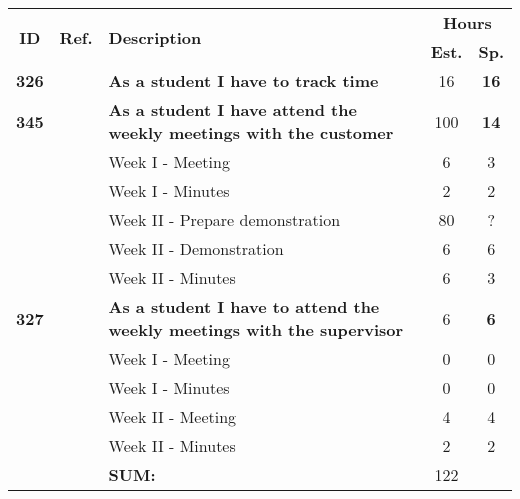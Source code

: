 \label{tab:sprint5storiesProcess}
\def\arraystretch{1.25}
 
\begin{longtable}{ccXcc}

\toprule[0.5mm]
\multirow{2}{*}{\textbf{ID}} &
\multirow{2}{*}{\textbf{Ref.}} & \multirow{2}{*}{\textbf{Description}} & \multicolumn{2}{c}{\textbf{Hours}} \\
 					& & & \textbf{Est.} & \textbf{Sp.} \\

\midrule

\textbf{326} 	&& {\bf  As a student I have to track time} 										& 	16	& \textbf{16} \\
	
\textbf{345} 	&& {\bf As a student I have attend the weekly meetings with the customer} 			& 	100	& \textbf{14} \\
		&& Week I - Meeting							&  6  & 3 \\
		&& Week I - Minutes							&  2  & 2 \\
		&& Week II - Prepare demonstration			&  80 & ? \\
		&& Week II - Demonstration					&  6  & 6 \\
		&& Week II - Minutes						&  6  & 3 \\


		
\textbf{327} 	&& {\bf As a student I have to attend the weekly meetings with the supervisor} 		& 	6	& \textbf{6} \\
		&& Week I - Meeting							&  0 & 0 \\
		&& Week I - Minutes							&  0 & 0 \\
		&& Week II - Meeting						&  4 & 4 \\
		&& Week II - Minutes						&  2 & 2 \\

				
				
\hline
				&& \textbf{SUM:}		&		122	& \textbf{}
 \\																			
\bottomrule[0.5mm]
\end{longtable}
